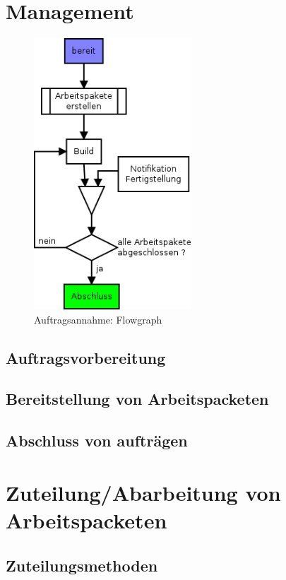 \section{Management}



\begin{figure}[ht] 
  \label{fig:lebenszyklus-auftrag-abarbeitung}
  \begin{center}
      \includegraphics[height=4in]{imageinput/lebenszyklus-auftrag-abarbeitung.png}
  \end{center}
  \caption{Auftragsannahme: Flowgraph}
\end{figure}

\subsection{Auftragsvorbereitung}
\subsection{Bereitstellung von Arbeitspacketen}
\subsection{Abschluss von auftr\"agen}


\section{Zuteilung/Abarbeitung von Arbeitspacketen}

\subsection{Zuteilungsmethoden}

